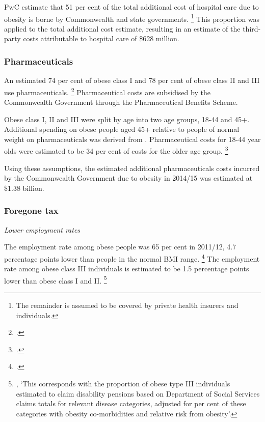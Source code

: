 \documentclass[embargoed]{grattan}
\begin{document}
PwC estimate that 51 per cent of the total additional cost of hospital care due to obesity is borne by Commonwealth and state governments.%
\footnote{The remainder is assumed to be covered by private health insurers and individuals.} This proportion was applied to the total additional cost estimate, resulting in an estimate of the third-party costs attributable to hospital care of \$628 million.

\subsubsection{Pharmaceuticals }\label{pharmaceuticals}

An estimated 74 per cent of obese class I and 78 per cent of obese class II and III use pharmaceuticals.%
\footcite{Buchmueller2015Obesityhealthexpenditures} Pharmaceutical costs are subsidised by the Commonwealth Government through the Pharmaceutical Benefits Scheme.

Obese class I, II and III were split by age into two age groups, 18-44 and 45+.
Additional spending on obese people aged 45+ relative to people of normal weight on pharmaceuticals was derived from \textcite{Buchmueller2015Obesityhealthexpenditures}.
Pharmaceutical costs for 18-44 year olds were estimated to be 34 per cent of costs for the older age group.%
\footcite[][50]{PwC2015Weighingcostobesity}

Using these assumptions, the estimated additional pharmaceuticals costs incurred by the Commonwealth Government due to obesity in 2014/15 was estimated at \$1.38 billion.

\subsubsection{Foregone tax}\label{foregone-tax}

\emph{Lower employment rates}

The employment rate among obese people was 65 per cent in 2011/12, 4.7 percentage points lower than people in the normal BMI range.%
\footcite{ABS2013436405503AustralianHealth} The employment rate among obese class III individuals is estimated to be 1.5 percentage points lower than obese class I and II.%
\footnote{\textcite[][59]{PwC2015Weighingcostobesity}, `This corresponds with the proportion of obese type III individuals estimated to claim disability pensions based on Department of Social Services claims totals for relevant disease categories, adjusted for per cent of these categories with obesity co-morbidities and relative risk from obesity'.}
\end{document}
